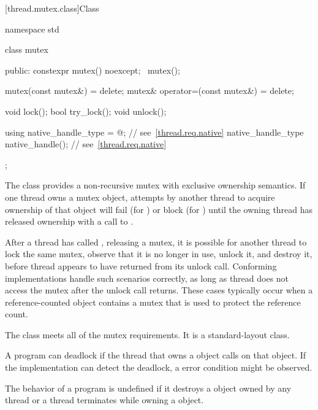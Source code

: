 [thread.mutex.class]{Class }

%
\begin{codeblock}
namespace std {
  class mutex {
  public:
    constexpr mutex() noexcept;
    ~mutex();

    mutex(const mutex&) = delete;
    mutex& operator=(const mutex&) = delete;

    void lock();
    bool try_lock();
    void unlock();

    using native_handle_type = @\impdefnc@;          // see~\ref{thread.req.native}
    native_handle_type native_handle();                         // see~\ref{thread.req.native}
  };
}
\end{codeblock}

\pnum
{}%
The class  provides a non-recursive mutex with exclusive ownership
semantics. If one thread owns a mutex object, attempts by another thread to acquire
ownership of that object will fail (for ) or block (for
) until the owning thread has released ownership with a call to
.

\pnum
\begin{note}
After a thread  has called , releasing a mutex, it is possible for another
thread  to lock the same mutex, observe that it is no longer in use, unlock it, and
destroy it, before thread  appears to have returned from its unlock call. Conforming implementations
handle such scenarios correctly, as long as thread  does not access the
mutex after the unlock call returns. These cases typically occur when a reference-counted object
contains a mutex that is used to protect the reference count.
\end{note}

\pnum
The class  meets
all of the mutex requirements.
It is a standard-layout class.

\pnum
\begin{note}
A program can deadlock if the thread that owns a  object calls
 on that object. If the implementation can detect the deadlock,
a  error condition might be observed.
\end{note}

\pnum
The behavior of a program is undefined if
it destroys a  object owned by any thread or
a thread terminates while owning a  object.

